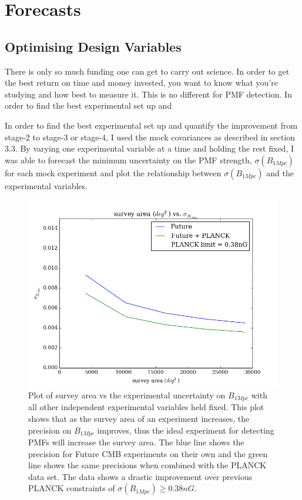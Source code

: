 \section{Forecasts}

\subsection{Optimising Design Variables}

There is only so much funding one can get to carry out science. In order to get the best return on time and money invested, you want to know what you're studying and how best to measure it. This is no different for PMF detection. In order to find the best experimental set up and

In order to find the best experimental set up and quantify the improvement from stage-2 to stage-3 or stage-4, I used the mock covariances as described in section 3.3. By varying one experimental variable at a time and holding the rest fixed, I was able to forecast the minimum uncertainty on the PMF strength, $\sigma(B_{1Mpc})$ for each mock experiment and plot the relationship between $\sigma(B_{1Mpc})$ and the experimental variables.

\begin{figure}[h]
\centering
\includegraphics[scale=0.8]{images/area.png}
\caption{Plot of survey area vs the experimental uncertainty on $B_{1Mpc}$ with all other independent experimental variables held fixed. This plot shows that as the survey area of an experiment increases, the precision on $B_{1Mpc}$ improves, thus the ideal experiment for detecting PMFs will increase the survey area. The blue line shows the precision for Future CMB experiments on their own and the green line shows the same precisions when combined with the PLANCK data set. The data shows a drastic improvement over previous PLANCK constraints of $\sigma(B_{1Mpc}) \geq 0.38nG$.}
\label{fig:area}
\end{figure}

